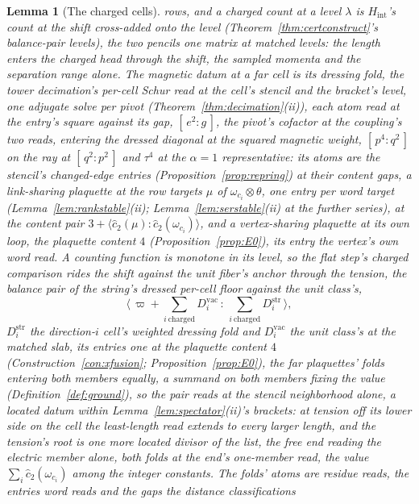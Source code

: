 \documentclass[11pt]{article}
\newtheorem{lemma}{Lemma}
\theoremstyle{definition}
\begin{document}
\begin{lemma}[The charged cells]
rows, and a charged count
at a level $\lambda$ is $H_{\mathrm{int}}$'s count at the shift
cross-added onto the level (Theorem~\ref{thm:certconstruct}'s
balance-pair levels), the two pencils one matrix at matched levels: the
length enters the charged head through the shift, the
sampled momenta and the separation range alone. The magnetic datum
at a far cell is its \emph{dressing fold}, the tower decimation's
per-cell Schur read at the cell's stencil and the bracket's level,
one adjugate solve per pivot (Theorem~\ref{thm:decimation}(ii)),
each atom read at the entry's square against its gap,
$[\,e^{2}:g\,]$, the pivot's cofactor at the coupling's two reads,
entering the dressed diagonal at the squared magnetic weight,
$[\,p^4:q^2\,]$ on the ray at $[\,q^2:p^2\,]$ and $\tau^4$ at the
$\alpha{=}1$ representative: its atoms are the stencil's
changed-edge entries (Proposition~\ref{prop:repring}) at their
content gaps, a link-sharing plaquette at the row targets $\mu$ of
$\omega_{c_i}\otimes\theta$, one entry per word target
(Lemma~\ref{lem:rankstable}(ii); Lemma~\ref{lem:serstable}(ii)
at the further series), at the content pair
$3+\langle\hat c_2(\mu)\!:\!\hat c_2(\omega_{c_i})\rangle$, and a
vertex-sharing plaquette at its own loop, the plaquette content $4$
(Proposition~\ref{prop:E0}), its entry the vertex's own word read. A counting function is
monotone in its level, so the flat step's charged comparison rides the
shift against the unit fiber's anchor through the \emph{tension},
the balance pair of the string's dressed per-cell floor against the
unit class's,
\[
\Big\langle\,\varpi+\sum_{i\ \mathrm{charged}}D^{\mathrm{vac}}_i
\,:\,\sum_{i\ \mathrm{charged}}D^{\mathrm{str}}_i\,\Big\rangle ,
\]
$D^{\mathrm{str}}_i$ the direction-$i$ cell's weighted dressing fold
and $D^{\mathrm{vac}}_i$ the unit class's at the matched slab, its
entries one at the plaquette content $4$
(Construction~\ref{con:xfusion}; Proposition~\ref{prop:E0}), the far
plaquettes' folds entering both members equally, a summand on both
members fixing the value (Definition~\ref{def:ground}), so the pair
reads at the stencil neighborhood alone, a located datum
within Lemma~\ref{lem:spectator}(ii)'s brackets: at tension off its
lower side on the cell the least-length read extends to every larger
length, and the tension's root is one more located divisor of the
list, the free end reading the electric member alone, both folds
at the end's one-member read, the value
$\sum_i\hat c_2(\omega_{c_i})$ among the
integer constants. The folds' atoms are residue reads, the entries
word reads and the gaps the distance classifications

\end{lemma}
\end{document}
